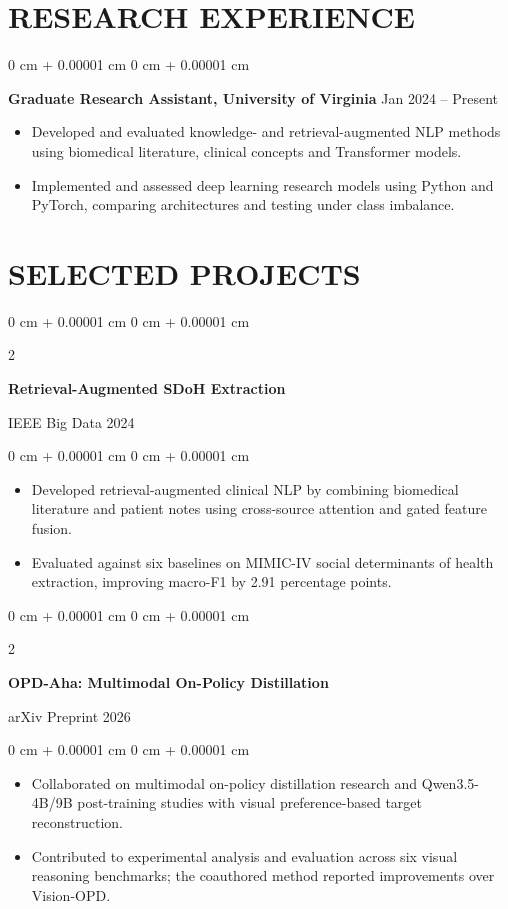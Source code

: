 \documentclass[10pt, letterpaper]{article}
\newenvironment{highlights}{
    \begin{itemize}[
        topsep=0.03 cm,
        parsep=0.03 cm,
        partopsep=0pt,
        itemsep=0pt,
        leftmargin=0 cm + 10pt
    ]
}{
    \end{itemize}
} %
\newenvironment{onecolentry}{
    \begin{adjustwidth}{
        0 cm + 0.00001 cm
    }{
        0 cm + 0.00001 cm
    }
}{
    \end{adjustwidth}
} %
\newenvironment{twocolentry}[2][]{
    \onecolentry
    \def\secondColumn{#2}
    \setcolumnwidth{\fill, 4.5 cm}
    \begin{paracol}{2}
}{
    \switchcolumn \raggedleft \secondColumn
    \end{paracol}
    \endonecolentry
} %
\begin{document}
\section{RESEARCH EXPERIENCE}
\begin{onecolentry}
\textbf{Graduate Research Assistant, University of Virginia} \hfill Jan 2024 -- Present
\begin{highlights}
\item Developed and evaluated knowledge- and retrieval-augmented NLP methods using biomedical literature, clinical concepts and Transformer models.
\item Implemented and assessed deep learning research models using Python and PyTorch, comparing architectures and testing under class imbalance.
\end{highlights}
\end{onecolentry}
\section{SELECTED PROJECTS}
\begin{twocolentry}{IEEE Big Data 2024}
\textbf{Retrieval-Augmented SDoH Extraction}
\end{twocolentry}
\begin{onecolentry}
\begin{highlights}
\item Developed retrieval-augmented clinical NLP by combining biomedical literature and patient notes using cross-source attention and gated feature fusion.
\item Evaluated against six baselines on MIMIC-IV social determinants of health extraction, improving macro-F1 by 2.91 percentage points.
\end{highlights}
\end{onecolentry}
\vspace{0.035 cm}

\begin{twocolentry}{arXiv Preprint 2026}
\textbf{OPD-Aha: Multimodal On-Policy Distillation}
\end{twocolentry}
\begin{onecolentry}
\begin{highlights}
\item Collaborated on multimodal on-policy distillation research and Qwen3.5-4B/9B post-training studies with visual preference-based target reconstruction.
\item Contributed to experimental analysis and evaluation across six visual reasoning benchmarks; the coauthored method reported improvements over Vision-OPD.
\end{highlights}
\end{onecolentry}
\vspace{0.035 cm}
\end{document}

